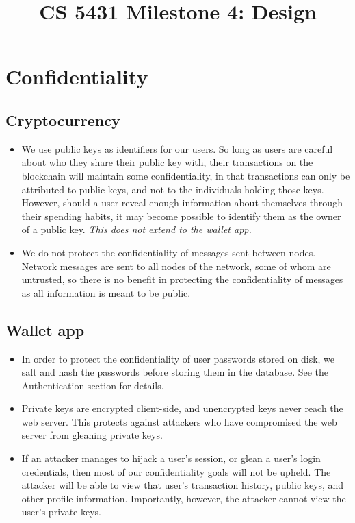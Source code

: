 \documentclass[a4paper,12pt]{article}
\title{CS 5431 Milestone 4: Design}
\author{
\iam{James Cassell}{jcc384}
\and
\iam{Evan King}{esk79}
\and
\iam{Ethan Koenig}{etk39}
\and
\iam{Eric Perdew}{ecp84}
\and
\iam{Will Ronchetti}{wrr33}
}
\begin{document}
\maketitle

\section{Confidentiality}

\subsection{Cryptocurrency}

\begin{itemize}
	\item We use public keys as identifiers for our users. So long as users are careful about who they share their public key with, their transactions on the blockchain will maintain some confidentiality, in that transactions can only be attributed to public keys, and not to the individuals holding those keys.
	However, should a user reveal enough information about themselves through their spending habits, it may become possible to identify them as the owner of a public key.
	\textit{This does not extend to the wallet app.}
	\item We do not protect the confidentiality of messages sent between nodes.
	Network messages are sent to all nodes of the network, some of whom are untrusted, so there is no benefit in protecting the confidentiality of messages as all information is meant to be public.
\end{itemize}

\subsection{Wallet app}

\begin{itemize}
	\item In order to protect the confidentiality of user passwords stored on disk, we salt and hash the passwords before storing them in the database.
	See the Authentication section for details.
	\item Private keys are encrypted client-side, and unencrypted keys never reach the web server.
	This protects against attackers who have compromised the web server from gleaning private keys.
	\item If an attacker manages to hijack a user's session, or glean a user's login credentials, then most of our confidentiality goals will not be upheld.
	The attacker will be able to view that user's transaction history, public keys, and other profile information.
	Importantly, however, the attacker cannot view the user's private keys.
\end{itemize}
\end{document}

